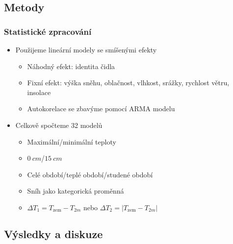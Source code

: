 \documentclass[
	11pt, %
]{beamer}
\begin{document}
\subsection{Metody}
\frametitle{Statistické zpracování}
\begin{frame}
	\begin{itemize}
		\item Použijeme lineární modely se smíšenými efekty
		\begin{itemize}
			\item Náhodný efekt: identita čidla
			\item Fixní efekt: výška sněhu, oblačnost, vlhkost, srážky, rychlost větru, insolace
			\item Autokorelace se zbavýme pomocí ARMA modelu
		\end{itemize}
	\item Celkově spočteme 32 modelů 
		\begin{itemize}
				\item Maximální/minimální teploty
				\item $\SI{0}{cm}$/$\SI{15}{cm}$
				\item Celé období/teplé období/studené období
				\item Sníh jako kategorická proměnná
				\item $\Delta T_1 = T_{\text{zem}}-T_{2m}$ nebo $\Delta T_2 = \left|T_{\text{zem}}-T_{2m}\right|$
		\end{itemize}
	\end{itemize}
\end{frame}


\subsection{Výsledky a diskuze}
\end{document}
